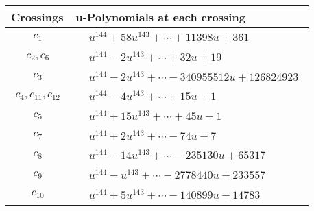 \documentclass[1p]{elsarticle_modified}
\theoremstyle{definition}
\begin{document}
\begin{tabular}{m{50pt}|m{274pt}}
Crossings & \hspace{64pt}u-Polynomials at each crossing \\
\hline $$\begin{aligned}c_{1}\end{aligned}$$&$\begin{aligned}
&u^{144}+58 u^{143}+\cdots+11398 u+361
\end{aligned}$\\
\hline $$\begin{aligned}c_{2},c_{6}\end{aligned}$$&$\begin{aligned}
&u^{144}-2 u^{143}+\cdots+32 u+19
\end{aligned}$\\
\hline $$\begin{aligned}c_{3}\end{aligned}$$&$\begin{aligned}
&u^{144}-2 u^{143}+\cdots-340955512 u+126824923
\end{aligned}$\\
\hline $$\begin{aligned}c_{4},c_{11},c_{12}\end{aligned}$$&$\begin{aligned}
&u^{144}-4 u^{143}+\cdots+15 u+1
\end{aligned}$\\
\hline $$\begin{aligned}c_{5}\end{aligned}$$&$\begin{aligned}
&u^{144}+15 u^{143}+\cdots+45 u-1
\end{aligned}$\\
\hline $$\begin{aligned}c_{7}\end{aligned}$$&$\begin{aligned}
&u^{144}+2 u^{143}+\cdots-74 u+7
\end{aligned}$\\
\hline $$\begin{aligned}c_{8}\end{aligned}$$&$\begin{aligned}
&u^{144}-14 u^{143}+\cdots-235130 u+65317
\end{aligned}$\\
\hline $$\begin{aligned}c_{9}\end{aligned}$$&$\begin{aligned}
&u^{144}- u^{143}+\cdots-2778440 u+233557
\end{aligned}$\\
\hline $$\begin{aligned}c_{10}\end{aligned}$$&$\begin{aligned}
&u^{144}+5 u^{143}+\cdots-140899 u+14783
\end{aligned}$\\
\hline
\end{tabular}\\~\\
\end{document}
